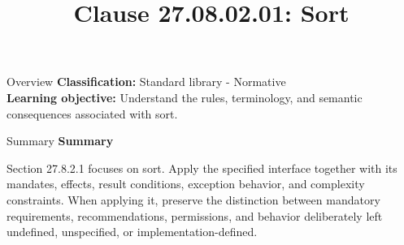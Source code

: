 \documentclass[10pt,letterpaper]{article}
\title{Clause 27.08.02.01: Sort}
\author{}
\date{}
\begin{document}
\maketitle
\begin{CornellOverviewBox}{Overview}
\textbf{Classification:} Standard library - Normative\\[2pt]
\textbf{Learning objective:} Understand the rules, terminology, and semantic consequences associated with sort.
\end{CornellOverviewBox}\begin{CornellSummaryBox}{Summary}
{\sffamily\bfseries\color{Accent} Summary}\par\vspace{3pt}Section 27.8.2.1 focuses on sort. Apply the specified interface together with its mandates, effects, result conditions, exception behavior, and complexity constraints. When applying it, preserve the distinction between mandatory requirements, recommendations, permissions, and behavior deliberately left undefined, unspecified, or implementation-defined.
\end{CornellSummaryBox}
\end{document}
